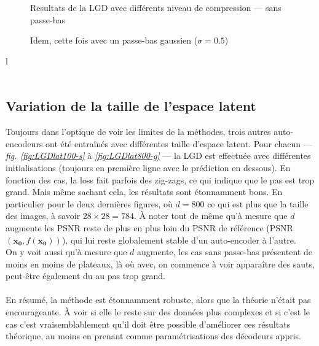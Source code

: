 \documentclass[hidelinks, french]{article} %
\renewcommand{\bf}[1]{\boldsymbol{#1}}
\theoremstyle{enonce}
\theoremstyle{special}
\theoremstyle{rq}
\theoremstyle{exo}
\theoremstyle{demo}
\begin{document}
\begin{figure}[H]\centering
	\caption{Resultats de la LGD avec différents niveau de compression --- sans passe-bas}
	\label{fig:LGDsizes-s}
\end{figure}

\begin{figure}[H]\centering
	\caption{Idem, cette fois avec un passe-bas gaussien ($\sigma=0.5$)}
	\label{fig:LGDsizes-g}
\end{figure}
{\color{white}l}
\\ \\



\subsection{Variation de la taille de l'espace latent}\label{sec:LGDlat}

Toujours dans l'optique de voir les limites de la méthodes, trois autres auto-encodeurs ont été entraînés avec différentes taille d'espace latent. Pour chacun --- \textit{fig. \ref{fig:LGDlat100-s}} à \textit{ \ref{fig:LGDlat800-g}} --- la LGD est effectuée avec différentes initialisations (toujours en première ligne avec le prédiction en dessous). En fonction des cas, la loss fait parfois des zig-zags, ce qui indique que le pas est trop grand. Mais même sachant cela, les résultats sont étonnamment bons. En particulier pour le deux dernières figures, où $d=800$ ce qui est plus que la taille des images, à savoir $28\times28=784$. \`A noter tout de même qu'à mesure que $d$ augmente les PSNR reste de plus en plus loin du PSNR de référence (PSNR$(\bf{x_0}, f(\bf{x_0}))$), qui lui reste globalement stable d'un auto-encoder à l'autre.
\\
On y voit aussi qu'à mesure que $d$ augmente, les cas sans passe-bas présentent de moins en moins de plateaux, là où avec, on commence à voir apparaître des sauts, peut-être également du au pas trop grand.
\\ \\

En résumé, la méthode est étonnamment robuste, alors que la théorie n'était pas encourageante. \`A voir si elle le reste sur des données plus complexes et si c'est le cas c'est vraisemblablement qu'il doit être possible d'améliorer ces résultats théorique, au moins en prenant comme paramétrisations des décodeurs appris.
\\
\end{document}
